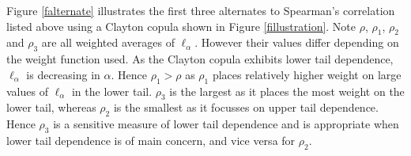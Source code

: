 \documentclass[authoryear]{elsarticle}
\newcommand{\fref}[1]{Figure \ref{#1}}
\begin{document}
\begin{itemize}
\end{itemize}

\fref{falternate} illustrates the first three alternates to Spearman's correlation listed above using a Clayton copula shown in \fref{fillustration}. Note $\rho$, $\rho_1$, $\rho_2$ and $\rho_3$ are all weighted averages of $\ell_\alpha$. However their values differ depending on the weight function used. As the Clayton copula exhibits lower tail dependence, $\ell_\alpha$ is decreasing in $\alpha$. Hence $\rho_1>\rho$ as $\rho_1$ places relatively higher weight on large values of $\ell_\alpha$ in the lower tail. $\rho_3$ is the largest as it places the most weight on the lower tail, whereas $\rho_2$ is the smallest as it focusses on upper tail dependence. Hence $\rho_3$ is a sensitive measure of lower tail dependence and is appropriate when lower tail dependence is of main concern, and vice versa for $\rho_2$.
\end{document}
